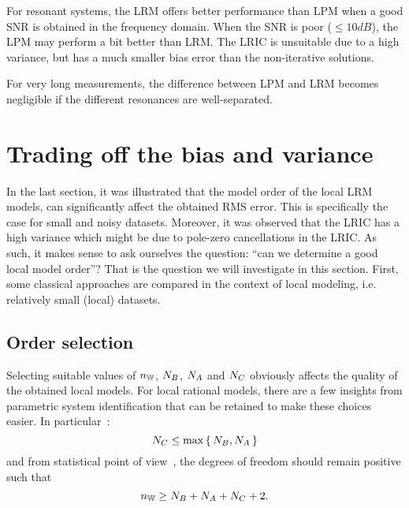 \begin{guideline}
For resonant systems, the \gls{LRM} offers better performance than \gls{LPM} when a good \gls{SNR} is obtained in the frequency domain.
When the \gls{SNR} is poor ($\leq 10\unit{dB}$), the \gls{LPM} may perform a bit better than \gls{LRM}.
The \gls{LRIC} is unsuitable due to a high variance, but has a much smaller bias error than the non-iterative solutions.
\end{guideline}

\begin{guideline}
For very long measurements, the difference between \gls{LPM} and \gls{LRM} becomes negligible if the different resonances are well-separated.
\end{guideline}

\section{Trading off the bias and variance}
In the last section, it was illustrated that the model order of the local \gls{LRM} models, can significantly affect the obtained \gls{RMS} error.
This is specifically the case for small and noisy datasets.
Moreover, it was observed that the \gls{LRIC} has a high variance which might be due to pole-zero cancellations in the \gls{LRIC}.
As such, it makes sense to ask ourselves the question: ``can we determine a good local model order''?
That is the question we will investigate in this section.
First, some classical approaches are compared in the context of local modeling, i.e. relatively small (local) datasets.


\subsection{Order selection}
\label{sec:nparam:orderSelection}
Selecting suitable values of $n_{\mathbb{W}}$, $N_{B}$, $N_{A}$ and $N_{C}$ obviously affects the quality of the obtained local models.
For local rational models, there are a few insights from parametric system identification that can be retained to make these choices easier.
In particular~\citep{Pintelon2010LPM1}:
\begin{equation}
N_{C} \leq \max\set{\ensuremath{N_{B}},\ensuremath{N_{A}}}
\end{equation}
 and from statistical point of view~\citep{Mahata2006}, the degrees of freedom should remain positive such that 
 \begin{equation}
 n_{\mathbb{W}} \geq N_{B} + N_{A} + N_{C} + 2
 \text{.}
 \end{equation}
 
